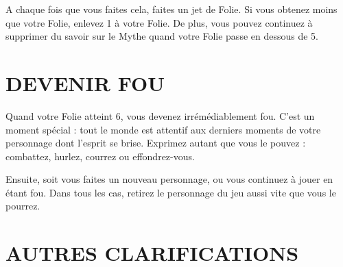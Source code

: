 A chaque fois que vous faites cela, faites un jet de Folie. Si vous obtenez moins que votre Folie, enlevez 1 à votre Folie. De plus, vous pouvez continuez à supprimer du savoir sur le Mythe quand votre Folie passe en dessous de 5.

\section{DEVENIR FOU}

Quand votre Folie atteint 6, vous devenez irrémédiablement fou. C'est un moment spécial : tout le monde est attentif aux derniers moments de votre personnage dont l'esprit se brise. Exprimez autant que vous le pouvez : combattez, hurlez, courrez ou effondrez-vous.

Ensuite, soit vous faites un nouveau personnage, ou vous continuez à jouer en étant fou. Dans tous les cas, retirez le personnage du jeu aussi vite que vous le pourrez.

\section{AUTRES CLARIFICATIONS}

